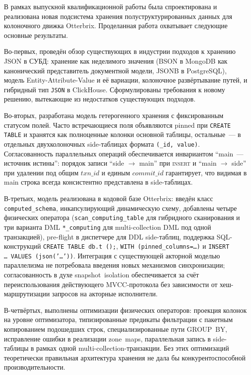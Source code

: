 
В рамках выпускной квалификационной работы была спроектирована и
реализована новая подсистема хранения полуструктурированных данных
для колоночного движка Otterbrix. Проделанная работа охватывает
следующие основные результаты.

Во-первых, проведён обзор существующих в индустрии подходов к
хранению JSON в СУБД: хранение как неделимого значения (BSON в
MongoDB как канонический представитель документной модели, JSONB в
PostgreSQL), модель Entity-Attribute-Value и её вариации,
колоночное развёртывание путей, и гибридный тип \texttt{JSON} в
ClickHouse. Сформулированы требования к новому решению,
вытекающие из недостатков существующих подходов.

Во-вторых, разработана модель гетерогенного хранения с
фиксированным статусом полей. Часто встречающиеся поля
объявляются pinned при \texttt{CREATE TABLE} и хранятся как
полноценные колонки основной таблицы, остальные~--- в отдельных
двухколоночных side-таблицах формата \texttt{(\_id, value)}.
Согласованность параллельных операций обеспечивается инвариантом
``main~--- источник истины'': порядок записи ``side $\to$ main''
при \textsc{insert} и ``main $\to$ side'' при удалении под общим
$\mathit{txn\_id}$ и единым $\mathit{commit\_id}$ гарантирует, что
видимая в main строка всегда консистентно представлена в
side-таблицах.

В-третьих, модель реализована в кодовой базе Otterbrix: введён
класс \texttt{computed\_schema}, инкапсулирующий динамическую
схему, добавлены четыре физических оператора
(\texttt{scan\_computing\_table} для гибридного сканирования и
три варианта DML \texttt{*\_computing} для multi-collection
DML под одной транзакцией), pre-flight в диспетчере для DDL
side-таблиц, поддержка SQL-конструкций
\texttt{CREATE TABLE db.t ();},
\texttt{WITH (pinned\_columns=\ldots)} и
\texttt{INSERT \ldots\ VALUES (json('\ldots'))}. Интеграция с
существующей акторной моделью параллелизма не потребовала введения
новых механизмов синхронизации; согласованность в духе
snapshot~isolation обеспечивается за счёт переиспользования
действующего MVCC-протокола без зависимости от хеш-маршрутизации
запросов на акторные исполнители.

В-четвёртых, выполнены оптимизации физических операторов:
проекция колонок на уровне оптимизатора, типизированные предикаты
фильтрации с пакетным копированием подошедших строк,
специализированные пути GROUP~BY, исправление ошибки в реализации
zone~maps, параллельная запись в side-таблицы в рамках одной
multi-collection-транзакции. Без этих оптимизаций теоретически
правильная архитектура хранения не дала бы конкурентоспособной
производительности.


